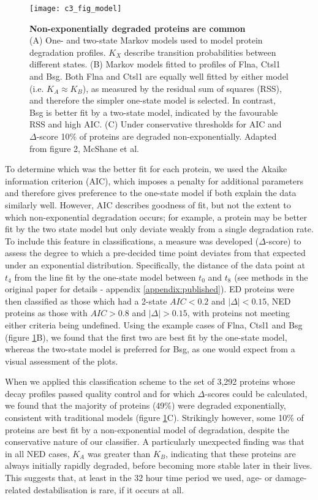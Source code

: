\documentclass[a4paper,11pt,twoside,openright]{scrbook}
\begin{document}
\begin{figure}[h]
    \texttt{[image: c3\_fig\_model]}
    \caption[Non-exponentially degraded proteins are common]{\sffamily \textbf{Non-exponentially degraded proteins are common} \\ \small (A) One- and two-state Markov models used to model protein degradation profiles. $K_{X}$ describe transition probabilities between different states. (B) Markov models fitted to profiles of Flna, Ctsl1 and Bsg. Both Flna and Ctsl1 are equally well fitted by either model (i.e. $K_{A} \approx K_{B}$), as measured by the residual sum of squares (RSS), and therefore the simpler one-state model is selected. In contrast, Bsg is better fit by a two-state model, indicated by the favourable RSS and high AIC. (C) Under conservative thresholds for AIC and $\Delta$-score 10\% of proteins are degraded non-exponentially. Adapted from figure 2, McShane et al.\cite{McShane2016}}
    \label{figure:model}
\end{figure}

To determine which was the better fit for each protein, we used the Akaike information criterion \cite{Akaike1974} (AIC), which imposes a penalty for additional parameters and therefore gives preference to the one-state model if both explain the data similarly well. However, AIC describes goodness of fit, but not the extent to which non-exponential degradation occurs; for example, a protein may be better fit by the two state model but only deviate weakly from a single degradation rate. To include this feature in classifications, a measure was developed ($\Delta$-score) to assess the degree to which a pre-decided time point deviates from that expected under an exponential distribution. Specifically, the distance of the data point at $t_{4}$ from the line fit by the one-state model between $t_{0}$ and $t_{8}$ (see methods in the original paper for details - appendix \ref{appendix:published}). ED proteins were then classified as those which had a 2-state $AIC < 0.2$ and $\lvert \Delta \rvert < 0.15$, NED proteins as those with $AIC > 0.8$ and $\lvert \Delta \rvert > 0.15$, with proteins not meeting either criteria being undefined. Using the example cases of Flna, Ctsl1 and Bsg (figure \ref{figure:model}B), we found that the first two are best fit by the one-state model, whereas the two-state model is preferred for Bsg, as one would expect from a visual assessment of the plots.

When we applied this classification scheme to the set of 3,292 proteins whose decay profiles passed quality control and for which $\Delta$-scores could be calculated, we found that the majority of proteins (49\%) were degraded exponentially, consistent with traditional models (figure \ref{figure:model}C). Strikingly however, some 10\% of proteins are best fit by a non-exponential model of degradation, despite the conservative nature of our classifier. A particularly unexpected finding was that in all NED cases, $K_{A}$ was greater than $K_{B}$, indicating that these proteins are always initially rapidly degraded, before becoming more stable later in their lives. This suggests that, at least in the 32 hour time period we used, age- or damage-related destabilisation is rare, if it occurs at all.
\end{document}
